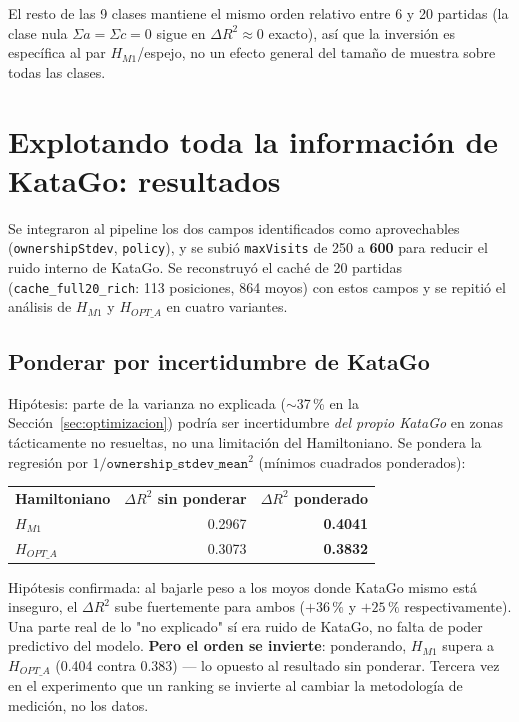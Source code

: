 \documentclass[11pt, a4paper]{article}
\newcommand{\TH}[1]{\cellcolor{cTHbg}\color{white}\textbf{#1}}
\newcommand{\good}[1]{\color{cGood}\textbf{#1}}
\begin{document}
El resto de las 9 clases mantiene el mismo orden relativo entre 6 y 20
partidas (la clase nula $\Sigma a=\Sigma c=0$ sigue en $\Delta R^2
\approx 0$ exacto), as\'i que la inversi\'on es espec\'ifica al par
$H_{M1}$/espejo, no un efecto general del tama\~no de muestra sobre
todas las clases.

\section{Explotando toda la informaci\'on de KataGo: resultados}
\label{sec:rich}

Se integraron al pipeline los dos campos identificados como
aprovechables (\texttt{ownershipStdev}, \texttt{policy}), y se subi\'o
\texttt{maxVisits} de 250 a \textbf{600} para reducir el ruido interno
de KataGo. Se reconstruy\'o el cach\'e de 20 partidas
(\texttt{cache\_full20\_rich}: 113 posiciones, 864 moyos) con estos
campos y se repiti\'o el an\'alisis de $H_{M1}$ y $H_{OPT\_A}$ en
cuatro variantes.

\subsection{Ponderar por incertidumbre de KataGo}

Hip\'otesis: parte de la varianza no explicada ($\sim$37\,\% en la
Secci\'on~\ref{sec:optimizacion}) podr\'ia ser incertidumbre \emph{del
propio KataGo} en zonas t\'acticamente no resueltas, no una limitaci\'on
del Hamiltoniano. Se pondera la regresi\'on por
$1/\texttt{ownership\_stdev\_mean}^2$ (m\'inimos cuadrados ponderados):

\medskip
\begin{center}
\begin{tabular}{lrr}
  \TH{Hamiltoniano} & \TH{$\Delta R^2$ sin ponderar} & \TH{$\Delta R^2$ ponderado} \\[1pt]
  $H_{M1}$      & 0.2967 & \good{0.4041} \\
  $H_{OPT\_A}$  & 0.3073 & \good{0.3832} \\
\end{tabular}
\end{center}
\medskip

\begin{tcolorbox}[quotebox]
  Hip\'otesis confirmada: al bajarle peso a los moyos donde KataGo mismo
  est\'a inseguro, el $\Delta R^2$ sube fuertemente para ambos ($+36\,\%$
  y $+25\,\%$ respectivamente). Una parte real de lo "no explicado"
  s\'i era ruido de KataGo, no falta de poder predictivo del modelo.
  \textbf{Pero el orden se invierte}: ponderando, $H_{M1}$ supera a
  $H_{OPT\_A}$ (0.404 contra 0.383) --- lo opuesto al resultado sin
  ponderar. Tercera vez en el experimento que un ranking se invierte
  al cambiar la metodolog\'ia de medici\'on, no los datos.
\end{tcolorbox}
\end{document}
